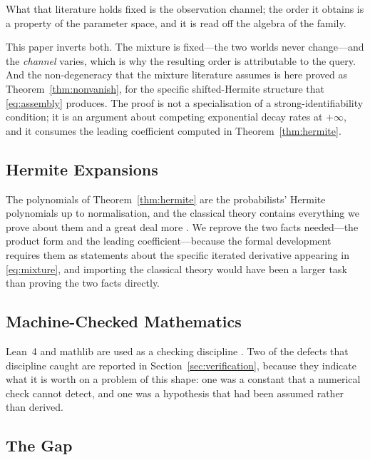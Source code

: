 What that literature holds fixed is the observation channel; the order it obtains is a
property of the parameter space, and it is read off the algebra of the family.

This paper inverts both. The mixture is fixed---the two worlds never change---and the
\emph{channel} varies, which is why the resulting order is attributable to the query. And
the non-degeneracy that the mixture literature assumes is here proved as
Theorem~\ref{thm:nonvanish}, for the specific shifted-Hermite structure that
\eqref{eq:assembly} produces. The proof is not a specialisation of a strong-identifiability
condition; it is an argument about competing exponential decay rates at $+\infty$, and it
consumes the leading coefficient computed in Theorem~\ref{thm:hermite}.

\subsection{Hermite Expansions}

The polynomials of Theorem~\ref{thm:hermite} are the probabilists' Hermite polynomials up to
normalisation, and the classical theory contains everything we prove about them and a great
deal more \cite{szego1939}. We reprove the two facts needed---the product form and the
leading coefficient---because the formal development requires them as statements about the
specific iterated derivative appearing in \eqref{eq:mixture}, and importing the classical
theory would have been a larger task than proving the two facts directly.

\subsection{Machine-Checked Mathematics}

Lean~4 and mathlib are used as a checking discipline \cite{demoura2021,mathlib2020}. Two of
the defects that discipline caught are reported in Section~\ref{sec:verification}, because
they indicate what it is worth on a problem of this shape: one was a constant that a
numerical check cannot detect, and one was a hypothesis that had been assumed rather than
derived.

\subsection{The Gap}

